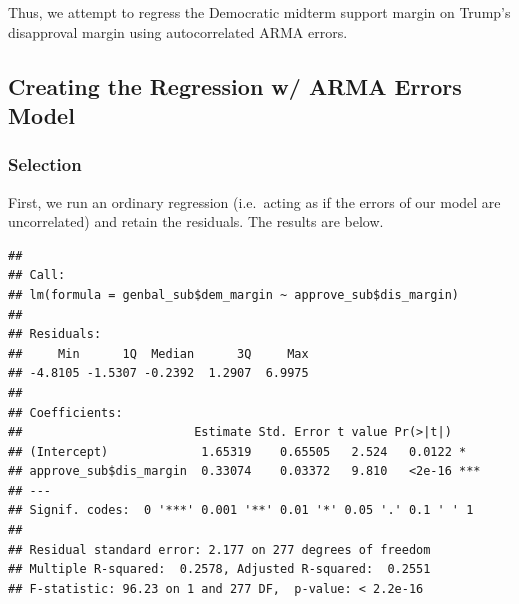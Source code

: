 \documentclass[]{article}
\newenvironment{Shaded}{\begin{snugshade}}{\end{snugshade}}
\newcommand{\KeywordTok}[1]{\textcolor[rgb]{0.13,0.29,0.53}{\textbf{#1}}}
\newcommand{\DataTypeTok}[1]{\textcolor[rgb]{0.13,0.29,0.53}{#1}}
\newcommand{\StringTok}[1]{\textcolor[rgb]{0.31,0.60,0.02}{#1}}
\newcommand{\OperatorTok}[1]{\textcolor[rgb]{0.81,0.36,0.00}{\textbf{#1}}}
\newcommand{\NormalTok}[1]{#1}
\begin{document}
Thus, we attempt to regress the Democratic midterm support margin on
Trump's disapproval margin using autocorrelated ARMA errors.

\subsection{Creating the Regression w/ ARMA Errors
Model}\label{creating-the-regression-w-arma-errors-model}

\subsubsection{Selection}\label{selection-1}

First, we run an ordinary regression (i.e.~acting as if the errors of
our model are uncorrelated) and retain the residuals. The results are
below.

\begin{Shaded}
\end{Shaded}

\begin{verbatim}
## 
## Call:
## lm(formula = genbal_sub$dem_margin ~ approve_sub$dis_margin)
## 
## Residuals:
##     Min      1Q  Median      3Q     Max 
## -4.8105 -1.5307 -0.2392  1.2907  6.9975 
## 
## Coefficients:
##                        Estimate Std. Error t value Pr(>|t|)    
## (Intercept)             1.65319    0.65505   2.524   0.0122 *  
## approve_sub$dis_margin  0.33074    0.03372   9.810   <2e-16 ***
## ---
## Signif. codes:  0 '***' 0.001 '**' 0.01 '*' 0.05 '.' 0.1 ' ' 1
## 
## Residual standard error: 2.177 on 277 degrees of freedom
## Multiple R-squared:  0.2578, Adjusted R-squared:  0.2551 
## F-statistic: 96.23 on 1 and 277 DF,  p-value: < 2.2e-16
\end{verbatim}

\begin{Shaded}
\end{Shaded}
\end{document}
